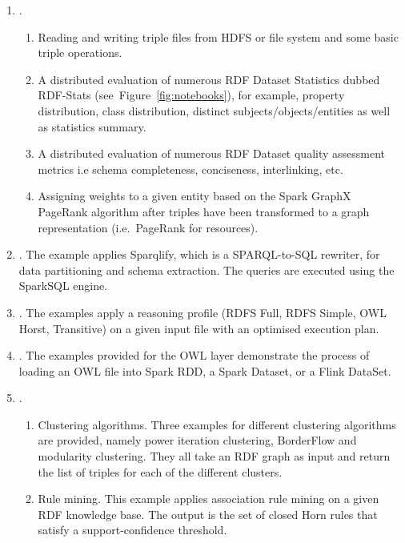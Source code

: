 \begin{enumerate}
    \item {}.
    \begin{enumerate}
      \item Reading and writing triple files from HDFS or file system and some basic triple operations.
      \item A distributed evaluation of numerous RDF Dataset Statistics dubbed RDF-Stats (see~Figure~\ref{fig:notebooks}), for example, property distribution, class distribution, distinct subjects/objects/entities as well as statistics summary.
      \item A distributed evaluation of numerous RDF Dataset quality assessment metrics i.e schema completeness, conciseness, interlinking, etc.
      \item Assigning weights to a given entity based on the Spark GraphX PageRank algorithm after triples have been transformed to a graph representation (i.e.~PageRank for resources).
    \end{enumerate}
    \item {}. 
    The example applies Sparqlify, which is a SPARQL-to-SQL rewriter, for data partitioning and schema extraction. The queries are executed using the SparkSQL engine.
    \item {}. The examples apply a reasoning profile (RDFS Full, RDFS Simple, OWL Horst, Transitive) on a given input file with an optimised execution plan.
    \item {}. The examples provided for the OWL layer demonstrate the process of loading an OWL file into Spark RDD, a Spark Dataset, or a Flink DataSet.
    \item {}.
    \begin{enumerate}
        \item Clustering algorithms. Three examples for different clustering algorithms are provided, namely power iteration clustering, BorderFlow and modularity clustering. 
        They all take an RDF graph as input and return the list of triples for each of the different clusters.
        \item Rule mining. This example applies association rule mining on a given RDF knowledge base. The output is the set of closed Horn rules that satisfy a support-confidence threshold.
    \end{enumerate}
\end{enumerate}

